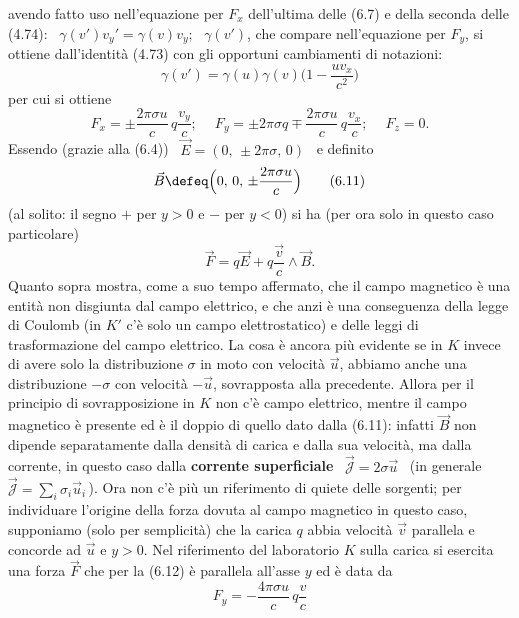 avendo fatto uso nell'equazione per $F_x$ dell'ultima delle (6.7) e della
seconda delle (4.74): \ $\gamma(v')v_y'=\gamma(v)v_y$; \ $\gamma(v')$, che
compare nell'equazione per $F_y$, si ottiene dall'identit\`a (4.73) con gli
opportuni cambiamenti di notazioni:
\begin{equation}
  \gamma(v')=\gamma(u)\gamma(v)\big(1-\frac{uv_x}{c^2}\big)
  \tag{6.9}
\end{equation}
per cui si ottiene
\begin{equation}
  F_x=\pm\frac{2\pi\sigma u}{c}\,q\frac{v_y}{c};\quad\ F_y=\pm2\pi\sigma q
  \mp\frac{2\pi\sigma u}{c}\,q\frac{v_x}{c};\quad\ F_z=0.
  \tag{6.10}
\end{equation}
Essendo \big(grazie alla (6.4)\big) \ $\vec E=(0,\,\pm2\pi\sigma,\,0)$ \ e
definito
\begin{equation}
  \vec B\defeq\Big(0,\,0,\,\pm\frac{2\pi\sigma u}{c}\Big)
  \tag{6.11}
\end{equation}
(al solito: il segno $+$ per $y>0$ e $-$ per $y<0$) si ha (per ora solo in
questo caso particolare)
\begin{equation}
  \vec F=q\vec E+q\frac{\vec v}{c}\wedge\vec B.
  \tag{6.12}
\end{equation}
Quanto sopra mostra, come a suo tempo affermato, che il campo magnetico \`e una
entit\`a non disgiunta dal campo elettrico, e che anzi \`e una conseguenza della
legge di Coulomb (in $K'$ c'\`e solo un campo elettrostatico) e delle leggi di
trasformazione del campo elettrico. La cosa \`e ancora pi\`u evidente se in $K$
invece di avere solo la distribuzione $\sigma$ in moto con velocit\`a $\vec u$,
abbiamo anche una distribuzione $-\sigma$ con velocit\`a $-\vec u$, sovrapposta
alla precedente. Allora per il principio di sovrapposizione in $K$ non c'\`e
campo elettrico, mentre il campo magnetico \`e presente ed \`e il doppio di
quello dato dalla (6.11): infatti $\vec B$ non dipende separatamente dalla
densit\`a di carica e dalla sua velocit\`a, ma dalla corrente, in questo caso
dalla \textbf{corrente superficiale} \ $\vec{\mathcal J}=2\sigma\vec u$ \ (in
generale \ $\vec{\mathcal J}=\sum_i\sigma_i\vec u_i$\,). Ora non c'\`e pi\`u un
riferimento di quiete delle sorgenti; per individuare l'origine della forza
dovuta al campo magnetico in questo caso, supponiamo (solo per semplicit\`a) che
la carica $q$ abbia velocit\`a $\vec v$ parallela e concorde ad $\vec u$ e
$y>0$. Nel riferimento del laboratorio $K$ sulla carica si esercita una forza
$\vec F$ che per la (6.12) \`e parallela all'asse $y$ ed \`e data da
\begin{equation}
  F_y=-\frac{4\pi\sigma u}{c}\,q\frac{v}{c}
  \tag{6.13}
\end{equation}
